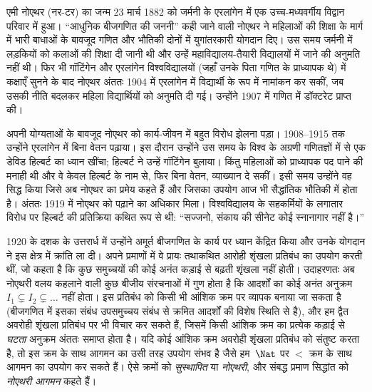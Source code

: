 \documentclass[../../../include/open-logic-section]{subfiles}
\begin{document}



एमी नोएथर (\textsc{नर}-टर) का जन्म 23 मार्च 1882 को जर्मनी के एरलांगेन
में एक उच्च-मध्यवर्गीय विद्वान परिवार में हुआ। ``आधुनिक बीजगणित की जननी''
कही जाने वाली नोएथर ने महिलाओं की शिक्षा के मार्ग में भारी बाधाओं के बावजूद
गणित और भौतिकी दोनों में युगांतरकारी योगदान दिए। उस समय जर्मनी में लड़कियों
को कलाओं की शिक्षा दी जानी थी और उन्हें महाविद्यालय-तैयारी विद्यालयों में
जाने की अनुमति नहीं थी। फिर भी गॉटिंगेन और एरलांगेन विश्वविद्यालयों (जहाँ
उनके पिता गणित के प्राध्यापक थे) में कक्षाएँ सुनने के बाद नोएथर अंततः 1904
में एरलांगेन में विद्यार्थी के रूप में नामांकन कर सकीं, जब उसकी नीति बदलकर
महिला विद्यार्थियों को अनुमति दी गई। उन्होंने 1907 में गणित में डॉक्टरेट
प्राप्त की।

अपनी योग्यताओं के बावजूद नोएथर को कार्य-जीवन में बहुत विरोध झेलना पड़ा।
1908--1915 तक उन्होंने एरलांगेन में बिना वेतन पढ़ाया। इस दौरान उन्होंने उस
समय के विश्व के अग्रणी गणितज्ञों में से एक डेविड हिल्बर्ट का ध्यान खींचा;
हिल्बर्ट ने उन्हें गॉटिंगेन बुलाया। किंतु महिलाओं को प्राध्यापक पद पाने की
मनाही थी और वे केवल हिल्बर्ट के नाम से, फिर बिना वेतन, व्याख्यान दे सकीं।
इसी समय उन्होंने वह सिद्ध किया जिसे अब नोएथर का प्रमेय कहते हैं और जिसका
उपयोग आज भी सैद्धांतिक भौतिकी में होता है। अंततः 1919 में नोएथर को पढ़ाने का
अधिकार मिला। विश्वविद्यालय के सहकर्मियों के लगातार विरोध पर हिल्बर्ट की
प्रतिक्रिया कथित रूप से थी: ``सज्जनो, संकाय की सीनेट कोई स्नानागार नहीं
है।''

1920 के दशक के उत्तरार्ध में उन्होंने अमूर्त बीजगणित के कार्य पर ध्यान
केंद्रित किया और उनके योगदान ने इस क्षेत्र में क्रांति ला दी। अपने प्रमाणों
में वे प्रायः तथाकथित आरोही शृंखला प्रतिबंध का उपयोग करती थीं, जो कहता है कि
कुछ समुच्चयों की कोई अनंत कड़ाई से बढ़ती शृंखला नहीं होती। उदाहरणतः अब
नोएथरी वलय कहलाने वाली कुछ बीजीय संरचनाओं में गुण होता है कि आदर्शों का कोई
अनंत अनुक्रम $I_1 \subsetneq I_2 \subsetneq \dots$ नहीं होता। इस प्रतिबंध
को किसी भी आंशिक क्रम पर व्यापक बनाया जा सकता है (बीजगणित में इसका संबंध
उपसमुच्चय संबंध से क्रमित आदर्शों की विशेष स्थिति से है), और हम द्वैत अवरोही
शृंखला प्रतिबंध पर भी विचार कर सकते हैं, जिसमें किसी आंशिक क्रम का प्रत्येक
कड़ाई से \emph{घटता} अनुक्रम अंततः समाप्त होता है। यदि कोई आंशिक क्रम अवरोही
शृंखला प्रतिबंध को संतुष्ट करता है, तो इस क्रम के साथ आगमन का उसी तरह उपयोग
संभव है जैसे हम~$\Nat$ पर $<$ क्रम के साथ आगमन का उपयोग कर सकते हैं। ऐसे
क्रमों को \emph{सुस्थापित} या \emph{नोएथरी}, और संबद्ध प्रमाण सिद्धांत को
\emph{नोएथरी आगमन} कहते हैं।
\end{document}
